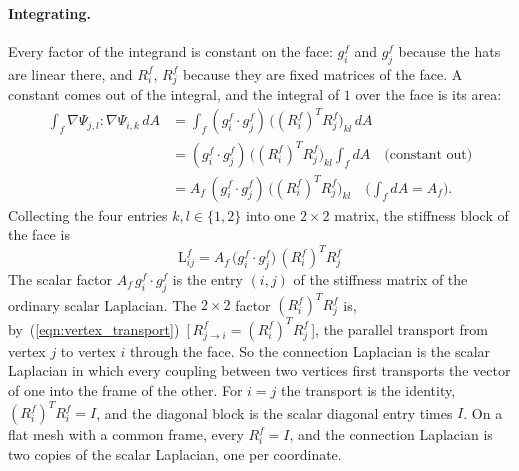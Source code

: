 \paragraph{Integrating.} Every factor of the integrand is constant on the face: $g_i^f$ and $g_j^f$ because the hats are linear there, and $R_i^f$, $R_j^f$ because they are fixed matrices of the face. A constant comes out of the integral, and the integral of $1$ over the face is its area:
\begin{align*}
\int_f \nabla \Psi_{j,l} : \nabla \Psi_{i,k}\, dA &= \int_f (g_i^f \cdot g_j^f)\,\big((R_i^f)^T R_j^f\big)_{kl}\, dA \\
&= (g_i^f \cdot g_j^f)\,\big((R_i^f)^T R_j^f\big)_{kl} \int_f dA \quad \text{(constant out)}\\
&= A_f\, (g_i^f \cdot g_j^f)\,\big((R_i^f)^T R_j^f\big)_{kl} \quad \Big(\textstyle\int_f dA = A_f\Big) .
\end{align*}
Collecting the four entries $k, l \in \{1, 2\}$ into one $2\times 2$ matrix, the stiffness block of the face is
\begin{equation}
\label{eqn:element_stiffness}
\boxed{\; \mathrm L^f_{ij} = A_f\, \big( g_i^f \cdot g_j^f \big)\, (R_i^f)^T R_j^f \;}
\end{equation}
The scalar factor $A_f\, g_i^f \cdot g_j^f$ is the entry $(i, j)$ of the stiffness matrix of the ordinary scalar Laplacian. The $2 \times 2$ factor $(R_i^f)^T R_j^f$ is, by~(\ref{eqn:vertex_transport})~[\,$R^f_{j\to i} = (R_i^f)^T R_j^f$\,], the parallel transport from vertex $j$ to vertex $i$ through the face. So the connection Laplacian is the scalar Laplacian in which every coupling between two vertices first transports the vector of one into the frame of the other. For $i = j$ the transport is the identity, $(R_i^f)^T R_i^f = I$, and the diagonal block is the scalar diagonal entry times $I$. On a flat mesh with a common frame, every $R_i^f = I$, and the connection Laplacian is two copies of the scalar Laplacian, one per coordinate.

